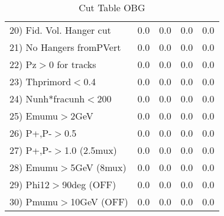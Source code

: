 \begin{table}[h!]
\begin{tabular}{||l||r|r|r|r||}
 20) Fid. Vol. Hanger cut &         0.0 &         0.0 &         0.0 &         0.0 \\
 21) No Hangers fromPVert &         0.0 &         0.0 &         0.0 &         0.0 \\
 22) Pz$>$0 for tracks    &         0.0 &         0.0 &         0.0 &         0.0 \\
 23) Thprimord$<$0.4      &         0.0 &         0.0 &         0.0 &         0.0 \\
 24) Nunh*fracunh$<$200   &         0.0 &         0.0 &         0.0 &         0.0 \\
 25) Emumu$>$2GeV         &         0.0 &         0.0 &         0.0 &         0.0 \\
 26) P+,P-$>$0.5          &         0.0 &         0.0 &         0.0 &         0.0 \\
 27) P+,P-$>$1.0 (2.5mux) &         0.0 &         0.0 &         0.0 &         0.0 \\
 28) Emumu$>$5GeV  (8mux) &         0.0 &         0.0 &         0.0 &         0.0 \\
 29) Phi12$>$90deg  (OFF) &         0.0 &         0.0 &         0.0 &         0.0 \\
 30) Pmumu$>$10GeV  (OFF) &         0.0 &         0.0 &         0.0 &         0.0 \\
 \hline
 \hline
 \end{tabular}
 \caption{Cut Table  OBG    }
 \label{tab-cut___obg}
 \end{table}
